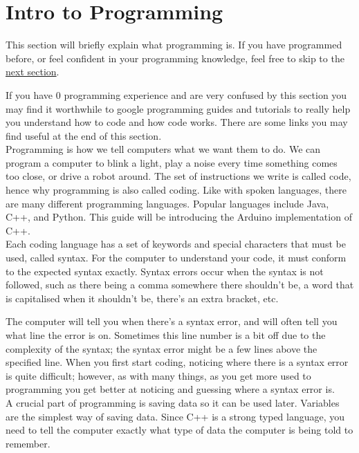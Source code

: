 \documentclass[../TinyBot.tex]{subfiles}
\begin{document}
\section{Intro to Programming}

This section will briefly explain what programming is. If you have programmed before, or feel confident in your programming knowledge, feel free to skip to the \href{sec:introarduino}{next section}.


If you have 0 programming experience and are very confused by this section you may find it worthwhile to google programming guides and tutorials to really help you understand how to code and how code works. There are some links you may find useful at the end of this section. \\


Programming is how we tell computers what we want them to do. We can program a computer to blink a light, play a noise every time something comes too close, or drive a robot around. The set of instructions we write is called code, hence why programming is also called coding. 
Like with spoken languages, there are many different programming languages. Popular languages include Java, C++, and Python. This guide will be introducing the Arduino implementation of C++. \\

Each coding language has a set of keywords and special characters that must be used, called syntax. For the computer to understand your code, it must conform to the expected syntax exactly. Syntax errors occur when the syntax is not followed, such as there being a comma somewhere there shouldn't be, a word that is capitalised when it shouldn't be, there's an extra bracket, etc.


The computer will tell you when there's a syntax error, and will often tell you what line the error is on. Sometimes this line number is a bit off due to the complexity of the syntax; the syntax error might be a few lines above the specified line. When you first start coding, noticing where there is a syntax error is quite difficult; however, as with many things, as you get more used to programming you get better at noticing and guessing where a syntax error is. \\ 

A crucial part of programming is saving data so it can be used later. Variables are the simplest way of saving data. Since C++ is a strong typed language, you need to tell the computer exactly what type of data the computer is being told to remember.\\
\end{document}
